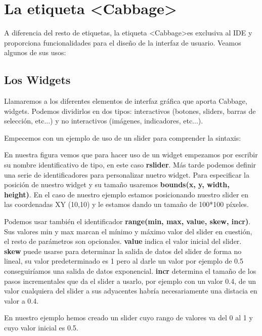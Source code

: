 \section{La etiqueta \textless Cabbage\textgreater}\label{sec:CabbageInst}

A diferencia del resto de etiquetas, la etiqueta \textless Cabbage\textgreater es exclusiva al IDE y proporciona funcionalidades para el diseño de la interfaz de usuario. Veamos algunos de sus usos:

\subsection{Los Widgets}

Llamaremos a los diferentes elementos de interfaz gráfica que aporta Cabbage, widgets. Podemos dividirlos en dos tipos: interactivos (botones, sliders, barras de selección, etc...) y no interactivos (imágenes, indicadores, etc...).

Empecemos con un ejemplo de uso de un slider para comprender la sintaxis:


En nuestra figura vemos que para hacer uso de un widget empezamos por escribir su nombre identificativo de tipo, en este caso \textbf{rslider}. Más tarde podemos definir una serie de identificadores para personalizar nuetro widget. Para especificar la posición de nuestro widget y su tamaño usaremos \textbf{bounds(x, y, width, height)}. En el caso de nuestro ejemplo estamos posicionando nuestro slider en las coordenadas XY (10,10) y le estamos dando un tamaño de 100*100 píxeles.

Podemos usar también el identificador \textbf{range(min, max, value, skew, incr)}. Sus valores min y max marcan el mínimo y máximo valor del slider en cuestión, el resto de parámetros son opcionales. \textbf{value} indica el valor inicial del slider. \textbf{skew} puede usarse para determinar la salida de datos del slider de forma no lineal, su valor predeterminado es 1 pero al darle un valor por ejemplo de 0.5 conseguiríamos una salida de datos exponencial. \textbf{incr} determina el tamaño de los pasos incrementales que da el slider a usarlo, por ejemplo con un valor 0.4, de un valor cualquiera del slider a sus adyacentes habría necesariamente una distacia en valor a 0.4.

En nuestro ejemplo hemos creado un slider cuyo rango de valores va del 0 al 1 y cuyo valor inicial es 0.5.

